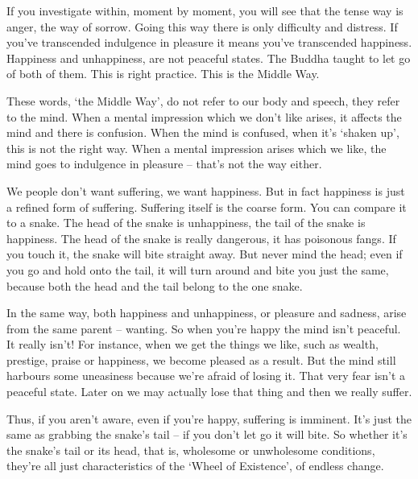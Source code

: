 If you investigate within, moment by moment, you will see that the tense way is anger, the way of sorrow. Going this way there is only difficulty and distress.  If you've transcended indulgence in pleasure it means you've transcended happiness. Happiness and unhappiness, are not peaceful states. The Buddha taught to let go of both of them. This is right practice. This is the Middle Way. 

These words, `the Middle Way', do not refer to our body and speech, they refer to the mind. When a mental impression which we don't like arises, it affects the mind and there is confusion. When the mind is confused, when it's `shaken up', this is not the right way. When a mental impression arises which we like, the mind goes to indulgence in pleasure -- that's not the way either. 

We people don't want suffering, we want happiness. But in fact happiness is just a refined form of suffering. Suffering itself is the coarse form. You can compare it to a snake. The head of the snake is unhappiness, the tail of the snake is happiness. The head of the snake is really dangerous, it has poisonous fangs. If you touch it, the snake will bite straight away. But never mind the head; even if you go and hold onto the tail, it will turn around and bite you just the same, because both the head and the tail belong to the one snake. 

In the same way, both happiness and unhappiness, or pleasure and sadness, arise from the same parent -- wanting. So when you're happy the mind isn't peaceful. It really isn't! For instance, when we get the things we like, such as wealth, prestige, praise or happiness, we become pleased as a result. But the mind still harbours some uneasiness because we're afraid of losing it. That very fear isn't a peaceful state. Later on we may actually lose that thing and then we really suffer. 

Thus, if you aren't aware, even if you're happy, suffering is imminent. It's just the same as grabbing the snake's tail -- if you don't let go it will bite. So whether it's the snake's tail or its head, that is, wholesome or unwholesome conditions, they're all just characteristics of the `Wheel of Existence', of endless change. 

